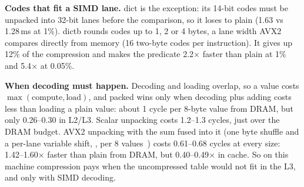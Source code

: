 \textbf{Codes that fit a SIMD lane.} dict is the exception: its 14-bit codes must be unpacked
into 32-bit lanes before the comparison, so it loses to plain (1.63 vs 1.28\,ms at 1\%). dictb
rounds codes up to 1, 2 or 4 bytes, a lane width AVX2 compares directly from memory (16 two-byte
codes per instruction). It gives up 12\% of the compression and makes the predicate 2.2$\times$
faster than plain at 1\% and 5.4$\times$ at 0.05\%.

\textbf{When decoding must happen.} Decoding and loading overlap, so a value costs
$\max(\mathrm{compute}, \mathrm{load})$, and packed wins only when decoding plus adding costs
less than loading a plain value: about 1 cycle per 8-byte value from DRAM, but only 0.26--0.30
in L2/L3. Scalar unpacking costs 1.2--1.3 cycles, just over the DRAM budget. AVX2 unpacking with
the sum fused into it (one byte shuffle and a per-lane variable shift, , per 8
values~\cite{lemire}) costs 0.61--0.68 cycles at every size: 1.42--1.60$\times$ faster than
plain from DRAM, but 0.40--0.49$\times$ in cache. So on this machine compression pays when the
uncompressed table would not fit in the L3, and only with SIMD decoding.
